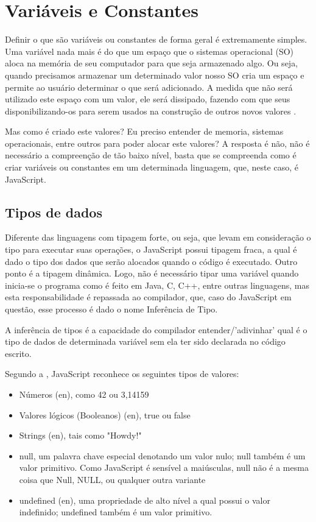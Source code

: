 \chapter{Variáveis e Constantes}

Definir o que são variáveis ou constantes de forma geral é extremamente 
simples. Uma variável nada mais é do que um espaço que o sistemas operacional 
(SO) aloca na memória de seu computador para que seja armazenado algo. Ou seja, 
quando precisamos armazenar um determinado valor nosso SO cria um espaço e 
permite ao usuário determinar o que será adicionado. A medida que não será 
utilizado este espaço com um valor, ele será dissipado, fazendo com que seus 
disponibilizando-os para serem usados na construção de outros novos valores 
\cite{haverbeke2014eloquent}.

Mas como é criado este valores? Eu preciso entender de memoria, sistemas 
operacionais, entre outros para poder alocar este valores? A resposta é não, 
não é necessário a compreenção de tão baixo nível, basta que se compreenda como 
é criar variáveis ou constantes em um determinada linguagem, que, neste caso, é 
JavaScript.

\section{Tipos de dados}

Diferente das linguagens com tipagem forte, ou seja, que levam em consideração 
o tipo para executar suas operações, o JavaScript possui tipagem fraca, a qual 
é dado o tipo dos dados que serão alocados quando o código é executado. Outro 
ponto é a tipagem dinâmica. Logo, não é necessário tipar uma variável quando 
inicia-se o programa como é feito em Java, C, C++, entre outras linguagens, mas 
esta responsabilidade é repassada ao compilador, que, caso do JavaScript em 
questão, esse processo é dado o nome Inferência de Tipo.

A inferência de tipos é a capacidade do compilador entender/’adivinhar’ qual é 
o tipo de dados de determinada variável sem ela ter sido declarada no código 
escrito. 

Segundo a , JavaScript reconhece os seguintes tipos 
de valores:

\begin{itemize}
  \item Números (en), como 42 ou 3,14159
  \item Valores lógicos (Booleanos) (en), true ou false
  \item Strings (en), tais como "Howdy!"
  \item null, um palavra chave especial denotando um valor nulo; null também é 
  um valor primitivo. Como JavaScript é sensível a maiúsculas, null não é a 
  mesma coisa que Null, NULL, ou qualquer outra variante
  \item undefined (en), uma propriedade de alto nível a qual possui o valor 
  indefinido; undefined também é um valor primitivo.  
\end{itemize}

